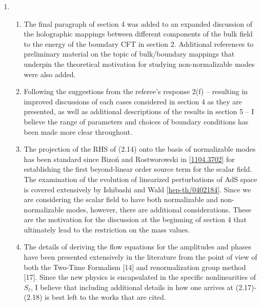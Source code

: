 \documentclass[11pt,letterpaper]{article}
\begin{document}
\begin{enumerate}
\begin{enumerate}
        Finally, I have addressed the case of three non-normalizable modes as an additional example of resonances that require special choices of either mass, number of dimensions, or driving frequency. Such cases are not addressed in this work, as they are not the most broadly applicable. I have also included a caveat below equation (2.19) to caution that not all possible resonances are addressed in this work. However, the procedure for deriving the contributions from special resonances is the same as the procedure for the cases that are included, and so I believe that including such resonances would not produce distinctly new results.
        \item I agree that (4.11) is satisfied for the choice of $d=3$ and $m^2 = -2$. Based on my response above, I have not included this special case; however, I have added a footnote above equation (4.11)  that addresses this case.
    \end{enumerate}
    \item %
    \begin{enumerate}
        \item The final paragraph of section 4 was added to an expanded discussion of the holographic mappings
        between different components of the bulk field to the energy of the boundary CFT in section 2. Additional references to preliminary material on the topic of bulk/boundary mappings that underpin the theoretical motivation for studying non-normalizable modes were also added.
        \item Following the suggestions from the referee's response 2(f) -- resulting in improved discussions of each cases considered in section 4 as they are presented, as well as additional descriptions of the results in section 5 -- I believe the range of parameters and choices of boundary conditions has been made more clear throughout.
        \item The projection of the RHS of (2.14) onto the basis of normalizable modes has been standard since Bizo\'n and Rostworowski in [\href{https://arxiv.org/abs/1104.3702}{1104.3702}] for establishing the first beyond-linear order source term for the scalar field. The examination of the evolution of linearized perturbations of AdS space is covered extensively by Ishibashi and Wald [\href{https://arxiv.org/abs/hep-th/0402184}{hep-th/0402184}]. Since we are considering the scalar field to have both normalizable and non-normalizable modes, however, there are additional considerations. These are the motivation for the discussion at the beginning of section 4 that ultimately lead to the restriction on the mass values.
        \item The details of deriving the flow equations for the amplitudes and phases have been presented extensively in the literature from the point of view of both the Two-Time Formalism [14] and renormalization group method [17]. Since the new physics is encapsulated in the specific nonlinearities of $S_\ell$, I believe that including additional details in how one arrives at (2.17)-(2.18) is best left to the works that are cited. 
        

\end{enumerate}
\end{enumerate}
\end{document}
